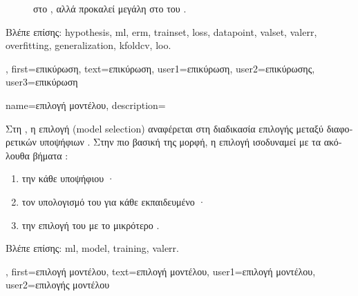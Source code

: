 {{\begin{figure}[H]
{{			\foreignlanguage{greek}{στο} , \foreignlanguage{greek}{αλλά προκαλεί μεγάλη}  
			\foreignlanguage{greek}{στο}  \foreignlanguage{greek}{του} . \label{fig_validation_dict}} }
		\end{figure} 
		\foreignlanguage{greek}{Βλέπε επίσης:} \gls{hypothesis}, \gls{ml}, \gls{erm}, \gls{trainset}, \gls{loss}, \gls{datapoint}, \gls{valset}, 
		\gls{valerr}, \gls{overfitting}, \gls{generalization}, \gls{kfoldcv}, \gls{loo}.},
	first={\foreignlanguage{greek}{επικύρωση}},
	text={\foreignlanguage{greek}{επικύρωση}},
	user1={\foreignlanguage{greek}{επικύρωση}}, %
	user2={\foreignlanguage{greek}{επικύρωσης}}, %
	user3={\foreignlanguage{greek}{επικύρωση}} %
}

{name={\foreignlanguage{greek}{επιλογή μοντέλου}},
	description={\foreignlanguage{greek}{Στη} , 
		\foreignlanguage{greek}{η επιλογή}  (model selection) \foreignlanguage{greek}{αναφέρεται στη 
		διαδικασία επιλογής μεταξύ διαφορετικών υποψήφιων} . \foreignlanguage{greek}{Στην πιο βασική 
		της μορφή, η επιλογή}  \foreignlanguage{greek}{ισοδυναμεί με τα ακόλουθα βήματα} 
		\cite[\foreignlanguage{greek}{Κεφ.} 6]{MLBasics}: 
		\begin{enumerate}[label=\arabic*)]
			\item \foreignlanguage{greek}{την}  \foreignlanguage{greek}{κάθε υποψήφιου} · 
			\item \foreignlanguage{greek}{τον υπολογισμό του}  \foreignlanguage{greek}{για κάθε εκπαιδευμένο} 
				· 
			\item \foreignlanguage{greek}{την επιλογή του}  \foreignlanguage{greek}{με το μικρότερο} 
				.
		\end{enumerate}
		\foreignlanguage{greek}{Βλέπε επίσης:} \gls{ml}, \gls{model}, \gls{training}, \gls{valerr}. },
	first={\foreignlanguage{greek}{επιλογή μοντέλου}},
	text={\foreignlanguage{greek}{επιλογή μοντέλου}},
	user1={\foreignlanguage{greek}{επιλογή μοντέλου}}, %
	user2={\foreignlanguage{greek}{επιλογής μοντέλου}} %
}


